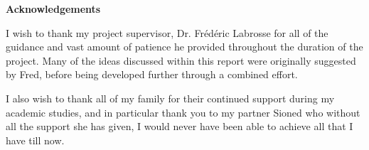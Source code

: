 \thispagestyle{empty}

\begin{center}
    {\LARGE\bf Acknowledgements}
\end{center}

I wish to thank my project supervisor, Dr. Fr\'{e}d\'{e}ric Labrosse for all of the guidance and vast amount of patience he provided throughout the duration of the project. Many of the ideas discussed within this report were originally suggested by Fred, before being developed further through a combined effort.

I also wish to thank all of my family for their continued support during my academic studies, and in particular thank you to my partner Sioned who without all the support she has given, I would never have been able to achieve all that I have till now.